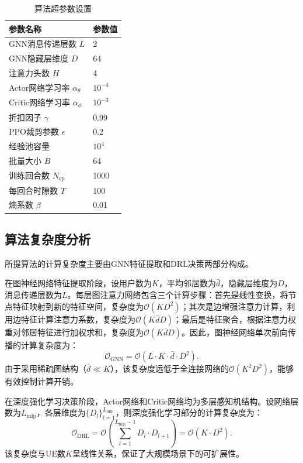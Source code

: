 \begin{table}[h]
\centering
\caption{算法超参数设置}
\label{tab:hyperparams}
\begin{tabular}{ll}
\hline
参数名称 & 参数值 \\
\hline
GNN消息传递层数 $L$ & 2 \\
GNN隐藏层维度 $D$ & 64 \\
注意力头数 $H$ & 4 \\
Actor网络学习率 $\alpha_{\theta}$ & $10^{-4}$ \\
Critic网络学习率 $\alpha_{\phi}$ & $10^{-3}$ \\
折扣因子 $\gamma$ & 0.99 \\
PPO裁剪参数 $\epsilon$ & 0.2 \\
经验池容量 & $10^{4}$ \\
批量大小 $B$ & 64 \\
训练回合数 $N_{\text{ep}}$ & 1000 \\
每回合时隙数 $T$ & 100 \\
熵系数 $\beta$ & 0.01 \\
\hline
\end{tabular}
\end{table}

\subsection{算法复杂度分析}
所提算法的计算复杂度主要由GNN特征提取和DRL决策两部分构成。

在图神经网络特征提取阶段，设用户数为$K$，平均邻居数为$\bar{d}$，隐藏层维度为$D$，消息传递层数为$L$。每层图注意力网络包含三个计算步骤：首先是线性变换，将节点特征映射到新的特征空间，复杂度为$\mathcal{O}(KD^{2})$；其次是边增强注意力计算，利用边特征计算注意力系数，复杂度为$\mathcal{O}(K\bar{d}D)$；最后是特征聚合，根据注意力权重对邻居特征进行加权求和，复杂度为$\mathcal{O}(K\bar{d}D)$。因此，图神经网络单次前向传播的计算复杂度为：
\begin{equation}
\mathcal{O}_{\text{GNN}} = \mathcal{O}\left(L \cdot K \cdot \bar{d} \cdot D^{2}\right).
\end{equation}
由于采用稀疏图结构（$\bar{d} \ll K$），该复杂度远低于全连接网络的$\mathcal{O}(K^{2}D^{2})$，能够有效控制计算开销。

在深度强化学习决策阶段，Actor网络和Critic网络均为多层感知机结构。设网络层数为$L_{\text{mlp}}$，各层维度为$\{D_{l}\}_{l=1}^{L_{\text{mlp}}}$，则深度强化学习部分的计算复杂度为：
\begin{equation}
\mathcal{O}_{\text{DRL}} = \mathcal{O}\left(\sum_{l=1}^{L_{\text{mlp}}-1} D_{l} \cdot D_{l+1}\right) = \mathcal{O}(K \cdot D^{2}).
\end{equation}
该复杂度与UE数$K$呈线性关系，保证了大规模场景下的可扩展性。

